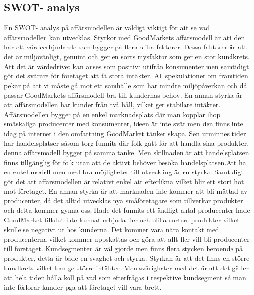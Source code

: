 \documentclass[10pt,a4paper,oneside]{article}
\begin{document}
\subsection{SWOT- analys}
En SWOT- analys på affärsmodellen är väldigt viktigt för att se vad affärsmodellen kan utvecklas. Styrkor med GoodMarkets affärsmodell är att den har ett värdeerbjudande som bygger på flera olika faktorer. Dessa faktorer är att det är miljövänligt, genuint och ger en sorts mysfaktor som ger en stor kundkrets. Att det är värdedrivet kan anses som positivt utifrån konsumenter men samtidigt gör det svårare för företaget att få stora intäkter. All spekulationer om framtiden pekar på att vi måste gå mot ett samhälle som har mindre miljöpåverkan och då passar GoodMarkets affärsmodell bra till kundernas behov. En annan styrka är att affärsmodellen har kunder från två håll, vilket ger stabilare intäkter. Affärsmodellen bygger på en enkel marknadsplats där man kopplar ihop småskaliga producenter med konsumenter, ideen är inte svår men den finns inte idag på internet i den omfattning GoodMarket tänker skapa. Sen urminnes tider har handelsplatser såsom torg funnits där folk gått för att handla sina produkter, denna affärsmodell bygger på samma tanke. Men skillnaden är att handelsplatsen finns tillgänglig för folk utan att de aktivt behöver besöka handelsplatsen.Att ha en enkel modell men med bra möjligheter till utveckling är en styrka. Samtidigt gör det att affärsmodellen är relativt enkel att efterlikna vilket blir ett stort hot mot företaget.  En annan styrka är att marknaden inte kommer att bli mättad av producenter, då det alltid utvecklas nya småföretagare som tillverkar produkter och detta kommer gynna oss. Hade det funnits ett ändligt antal producenter hade GoodMarket tillslut inte kunnat erbjuda fler och olika sorters produkter vilket skulle se negativt ut hos kunderna. Det kommer vara nära kontakt med producenterna vilket kommer uppskattas och göra att allt fler vill bli producenter till företaget. Kundsegmenten är väl gjorde men finns flera stycken beroende på produkter, detta är både en svaghet och styrka. Styrkan är att det finns en större kundkrets vilket kan ge större intäkter. Men svårigheter med det är att det gäller att hela tiden hålla koll på vad som efterfrågas i respektive kundsegment så man inte förlorar kunder pga att företaget vill vara brett. \\
\end{document}
